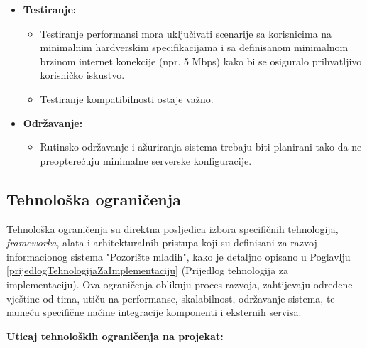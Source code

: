 \begin{itemize}
    \item \textbf{Testiranje:}

        \begin{itemize}
            \item Testiranje performansi mora uključivati scenarije sa korisnicima na minimalnim hardverskim specifikacijama i sa definisanom minimalnom brzinom internet konekcije (npr. 5 Mbps) kako bi se osiguralo prihvatljivo korisničko iskustvo.
        
            \item Testiranje kompatibilnosti ostaje važno.
        \end{itemize}
        
    \item \textbf{Održavanje:}

    \begin{itemize}
        \item Rutinsko održavanje i ažuriranja sistema trebaju biti planirani tako da ne preopterećuju minimalne serverske konfiguracije.
    \end{itemize}
    
\end{itemize}

\sloppy
\subsection{Tehnološka ograničenja}


Tehnološka ograničenja su direktna posljedica izbora specifičnih tehnologija, \textit{frameworka}, alata i arhitekturalnih pristupa koji su definisani za razvoj informacionog sistema "Pozorište mladih", kako je detaljno opisano u Poglavlju \ref{prijedlogTehnologijaZaImplementaciju} (Prijedlog tehnologija za implementaciju). Ova ograničenja oblikuju proces razvoja, zahtijevaju određene vještine od tima, utiču na performanse, skalabilnost, održavanje sistema, te nameću specifične načine integracije komponenti i eksternih servisa.


\textbf{Uticaj tehnoloških ograničenja na projekat:}

